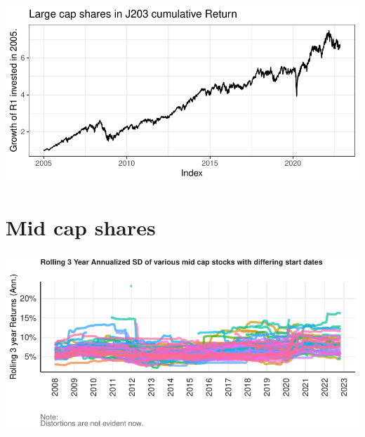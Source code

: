 \documentclass[11pt,preprint, authoryear]{elsarticle}
\let\origfigure\figure
\let\endorigfigure\endfigure
\renewenvironment{figure}[1][2] {
    \expandafter\origfigure\expandafter[H]
} {
    \endorigfigure
}
\numberwithin{equation}{section}
\numberwithin{figure}{section}
\numberwithin{table}{section}
\begin{document}
\begin{figure}[H]

{\centering \includegraphics{Volatility-of-Shares_files/figure-latex/Figure3-1} 

}

\caption{Caption Here \label{Figure3}}\label{fig:Figure3}
\end{figure}

\hypertarget{mid-cap-shares}{%
\section{\texorpdfstring{Mid cap shares
\label{Mid}}{Mid cap shares }}\label{mid-cap-shares}}

\begin{figure}[H]

{\centering \includegraphics{Volatility-of-Shares_files/figure-latex/Figure4-1} 

}

\caption{Caption Here \label{Figure4}}\label{fig:Figure4}
\end{figure}
\end{document}
